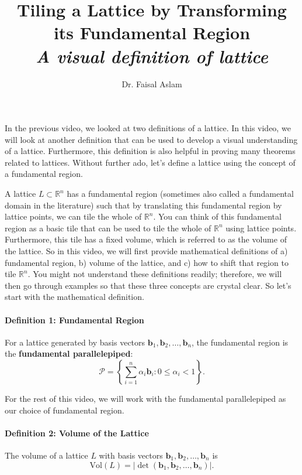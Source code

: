 \documentclass[11pt]{article}
\title{\Large\bfseries Tiling a Lattice by Transforming its Fundamental Region\\[2pt]
\normalsize\normalfont\itshape A visual definition of lattice}
\author{Dr. Faisal Aslam}
\date{}
\begin{document}
\maketitle
\vspace{-2em}

In the previous video, we looked at two definitions of a lattice. In this video, we will look at another definition that can be used to develop a visual understanding of a lattice. Furthermore, this definition is also helpful in proving many theorems related to lattices. Without further ado, let's define a lattice using the concept of a fundamental region.

A lattice $L \subset \mathbb{R}^n$ has a fundamental region (sometimes also called a fundamental domain in the literature) such that by translating this fundamental region by lattice points, we can tile the whole of $\mathbb{R}^n$. You can think of this fundamental region as a basic tile that can be used to tile the whole of $\mathbb{R}^n$ using lattice points. Furthermore, this tile has a fixed volume, which is referred to as the volume of the lattice. So in this video, we will first provide mathematical definitions of a) fundamental region, b) volume of the lattice, and c) how to shift that region to tile $\mathbb{R}^n$. You might not understand these definitions readily; therefore, we will then go through examples so that these three concepts are crystal clear. So let's start with the mathematical definition.

\paragraph{Definition 1: Fundamental Region}

For a lattice generated by basis vectors $\mathbf{b}_1, \mathbf{b}_2, \dots, \mathbf{b}_n$, the fundamental region is the \textbf{fundamental parallelepiped}:
$$
\mathcal{P} = \left\{ \sum_{i=1}^{n} \alpha_i \mathbf{b}_i : 0 \le \alpha_i < 1 \right\}.
$$

For the rest of this video, we will work with the fundamental parallelepiped as our choice of fundamental region.

\paragraph{Definition 2: Volume of the Lattice}

The volume of a lattice $L$ with basis vectors $\mathbf{b}_1, \mathbf{b}_2, \dots, \mathbf{b}_n$ is
$$
\text{Vol}(L) = \left| \det(\mathbf{b}_1, \mathbf{b}_2, \dots, \mathbf{b}_n) \right|.
$$
\end{document}
